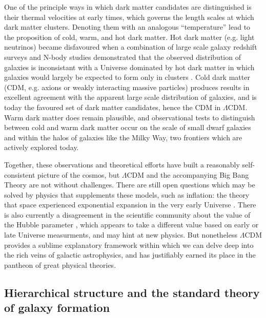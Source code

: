 One of the principle ways in which dark matter candidates are distinguished is their thermal velocities at early times, which governs the length scales at which dark matter clusters. Denoting them with an analogous ``temperature'' lead to the proposition of cold, warm, and hot dark matter. Hot dark matter (e.g. light neutrinos) became disfavoured when a combination of large scale galaxy redshift surveys and N-body studies demonstrated that the observed distribution of galaxies is inconsistant with a Universe dominated by hot dark matter in which galaxies would largely be expected to form only in clusters \parencite{white83}. Cold dark matter (CDM, e.g. axions or weakly interacting massive particles) produces results in excellent agreement with the apparent large scale distribution of galaxies, and is today the favoured set of dark matter candidates, hence the CDM in $\Lambda$CDM. Warm dark matter does remain plausible, and observational tests to distinguish between cold and warm dark matter occur on the scale of small dwarf galaxies and within the halos of galaxies like the Milky Way, two frontiers which are actively explored today.

Together, these observations and theoretical efforts have built a reasonably self-consistent picture of the cosmos, but $\Lambda$CDM and the accompanying Big Bang Theory are not without challenges. There are still open questions which may be solved by physics that supplements these models, such as inflation: the theory that space experienced exponential expansion in the very early Universe \parencite{guth81,linde82}. There is also currently a disagreement in the scientific community about the value of the Hubble parameter \parencite[see][]{divalentino21}, which appears to take a different value based on early or late Universe measurments, and may hint at new physics. But nonetheless $\Lambda$CDM provides a sublime explanatory framework within which we can delve deep into the rich veins of galactic astrophysics, and has justifiably earned its place in the pantheon of great physical theories.

\subsection{Hierarchical structure and the standard theory of galaxy formation}

